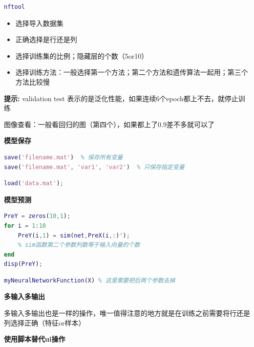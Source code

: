 \documentclass[12pt,a4paper,UTF8]{article}
\begin{document}
\begin{lstlisting}[language=Matlab,caption=打开神经网络工具箱]
nftool
\end{lstlisting}

\begin{itemize}
    \item 选择导入数据集
    \item 正确选择是行还是列
    \item 选择训练集的比例；隐藏层的个数（5or10）
    \item 选择训练方法：一般选择第一个方法；第二个方法和遗传算法一起用；第三个方法比较慢
\end{itemize}

\textbf{提示:} validation test 表示的是泛化性能，如果连续6个epoch都上不去，就停止训练

图像查看：一般看回归的图（第四个），如果都上了0.9差不多就可以了

\textbf{模型保存}

\begin{lstlisting}[language=Matlab,caption=保存模型]
save('filename.mat')  % 保存所有变量
save('filename.mat', 'var1', 'var2')  % 只保存指定变量
\end{lstlisting}

\begin{lstlisting}[language=Matlab,caption=从.mat文件中导入数据]
load('data.mat');
\end{lstlisting}

\textbf{模型预测}

\begin{lstlisting}[language=Matlab,caption=方法1：使用sim函数]
PreY = zeros(10,1);
for i = 1:10
    PreY(i,1) = sim(net,PreX(i,:)');
    % sim函数第二个参数列数等于输入向量的个数
end
disp(PreY);
\end{lstlisting}

\begin{lstlisting}[language=Matlab,caption=方法2：使用生成的函数]
myNeuralNetworkFunction(X) % 这里需要把后两个参数去掉
\end{lstlisting}
 
\textbf{多输入多输出}

多输入多输出也是一样的操作，唯一值得注意的地方就是在训练之前需要将行还是列选择正确（特征or样本）

\textbf{使用脚本替代ui操作}
\end{document}
